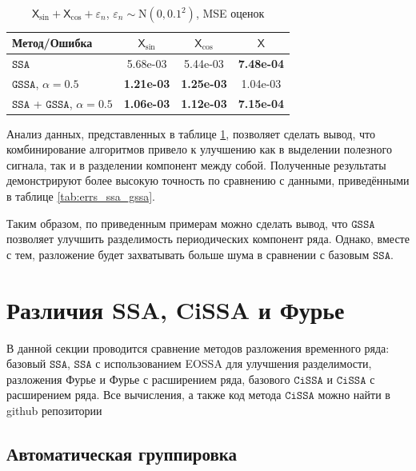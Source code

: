 \documentclass[12pt, specialist, subf
]{disser}
\theoremstyle{definition}
\newcommand{\SSA}{\texttt{SSA}}
\newcommand{\GSSA}{\texttt{GSSA}}
\newcommand{\CISSA}{\texttt{CiSSA}}
\newcommand{\TS}{\mathsf{X}}
\begin{document}
\begin{table}[H]
	\centering
	\caption{$\TS_{\sin} + \TS_{\cos}+
			\varepsilon_n$, $\varepsilon_n \sim \mathrm N(0, 0.1^2)$, MSE оценок }
	\label{tab:errs_ssa_gssa_unite}
	\begin{tabular}{l|ccc}
		\hline
		Метод/Ошибка                     & $\TS_{\sin}$      & $\TS_{\cos}$      & $\TS$             \\
		\hline
		$\SSA$                           & 5.68e-03          & 5.44e-03          & \textbf{7.48e-04} \\
		$\GSSA$, $\alpha = 0.5$          & \textbf{1.21e-03} & \textbf{1.25e-03} & 1.04e-03          \\
		\hline
		$\SSA$ + $\GSSA$, $\alpha = 0.5$ & \textbf{1.06e-03} & \textbf{1.12e-03} & \textbf{7.15e-04} \\
		\hline
	\end{tabular}
\end{table}

Анализ данных, представленных в таблице \ref{tab:errs_ssa_gssa_unite}, позволяет сделать вывод, что комбинирование алгоритмов привело к улучшению как в выделении полезного сигнала, так и в разделении компонент между собой. Полученные результаты демонстрируют более высокую точность по сравнению с данными, приведёнными в таблице \ref{tab:errs_ssa_gssa}.


Таким образом, по приведенным примерам можно сделать вывод, что $\GSSA$ позволяет улучшить разделимость периодических компонент ряда. Однако, вместе с тем, разложение будет захватывать больше шума в сравнении с базовым $\SSA$.




\newpage





\section{Различия SSA, CiSSA и Фурье}

\label{sec:comparison_cissa}
В данной секции проводится сравнение методов разложения временного ряда: базовый $\SSA$,  $\SSA$ с использованием EOSSA для улучшения разделимости, разложения Фурье и Фурье с расширением ряда, базового $\CISSA$ и $\CISSA$ с расширением ряда. Все вычисления, а также код метода $\CISSA$ можно найти в github репозитории \cite{spbu_cissa_coursework_github}


\subsection{Автоматическая группировка}
\end{document}
